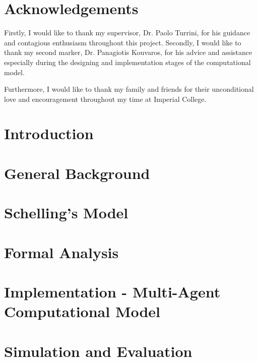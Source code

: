 \documentclass[twoside,openright]{article}
\let\oldsection\section%
\renewcommand{\section}{\cleardoublepage\oldsection}%
\begin{document}
\newpage
\section*{Acknowledgements}
Firstly, I would like to thank my supervisor, Dr. Paolo Turrini, for his guidance and contagious enthusiasm throughout this project. Secondly, I would like to thank my second marker, Dr. Panagiotis  Kouvaros, for his advice and assistance especially during the designing and implementation stages of the computational model.

Furthermore, I would like to thank my family and friends for their unconditional love and encouragement throughout my time at Imperial College.


\newpage
\tableofcontents
{}

\newpage
{}
\section{Introduction}


\newpage

\section{General Background}



\newpage
\section{Schelling's Model}


\newpage
\section{Formal Analysis}



\newpage
\section{Implementation - Multi-Agent Computational Model}


\newpage
\section{Simulation and Evaluation}

\end{document}
